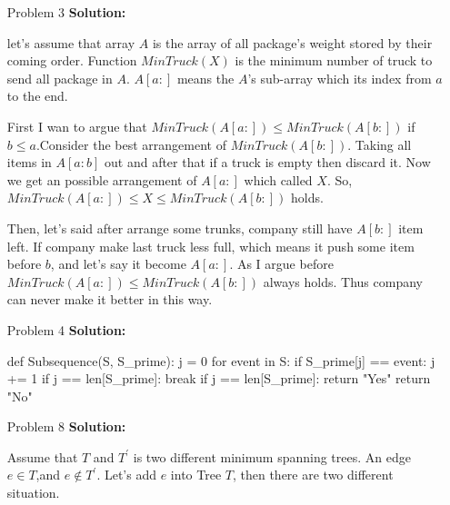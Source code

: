 \normalfont\documentclass[letterpaper,11pt]{article}
\begin{document}
\setlength{\parindent}{2ex}
\newcommand{\header}{
	\noindent {}
}
\bigskip
\header


	

\begin{enumerate}
\item [Problem 3]\textbf{Solution:}\par
let's assume that array $A$ is the array of all package's weight stored by their coming order. Function $MinTruck(X)$ is the minimum number of truck to send all package in $A$.
$A[a:]$ means the $A$'s sub-array which its index from $a$ to the end.\par
First I wan to argue that $MinTruck(A[a:]) \le MinTruck(A[b:])$ if $b \le a$.Consider the best arrangement of $MinTruck(A[b:])$. Taking all items in $A[a:b]$ out and after that if a truck is empty then discard it. Now we get an possible arrangement of $A[a:]$ which called $X$. So, $MinTruck(A[a:]) \le X \le MinTruck(A[b:]) $ holds.\par
Then, let's said after arrange some trunks, company still have $A[b:]$ item left. If company make last truck less full, which means it push some item before $b$, and let's say it become $A[a:]$. As I argue before $MinTruck(A[a:]) \le  MinTruck(A[b:])$ always holds. Thus company can never make it better in this way.
\item [Problem 4]\textbf{Solution:}\par
\begin{python}
def Subsequence(S, S_prime):
	j = 0
	for event in S:
		if S_prime[j] == event:
			j += 1
		if j == len[S_prime]:
			break
	if j == len[S_prime]:
		return "Yes"
	return "No"
\end{python}
\item [Problem 8]\textbf{Solution:}\par
Assume that $T$ and $T^\prime$ is two different minimum spanning trees. An edge $e \in T$,and $e\not\in T^\prime$. Let's add $e$ into Tree $T$, then there are two different situation.

\end{enumerate}
\end{document}
